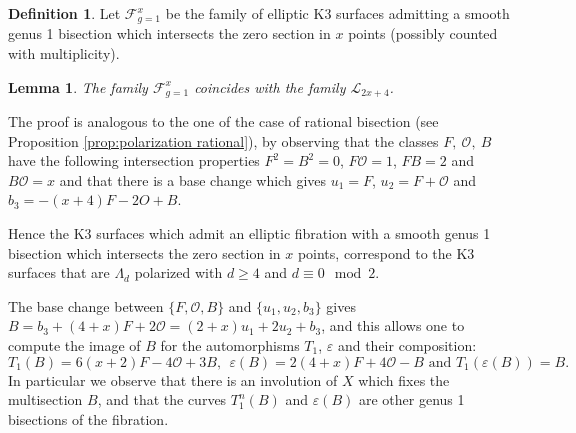 \documentclass{amsart}
\newtheorem{lemma}[theorem]{Lemma}
\theoremstyle{definition}
\newtheorem{definition}[theorem]{Definition}
\numberwithin{equation}{section}
\begin{document}
\begin{definition} Let $\mathcal{F}_{g=1}^x$ be the family of elliptic K3 surfaces admitting a smooth genus 1 bisection which intersects the zero section in $x$ points (possibly counted with multiplicity).\end{definition}
\begin{lemma}\label{lemma: family Fg1x} The family $\mathcal{F}^x_{g=1}$ coincides with the family $\mathcal{L}_{2x+4}$. 
\end{lemma}	
\proof The proof is analogous to the one of the case of rational bisection (see Proposition \ref{prop:polarization rational}), by observing that the classes $F,\ \mathcal{O},\ B$ have the following intersection properties $F^2=B^2=0$, $F\mathcal{O}=1$, $FB=2$ and $B\mathcal{O}=x$ and that there is a base change which gives $u_1=F$, $u_2=F+\mathcal{O}$ and $b_3=-(x+4)F-2O+B$.\endproof

Hence the K3 surfaces which admit an elliptic fibration with a smooth genus 1 bisection which intersects the zero section in $x$ points, correspond to the K3 surfaces that are $\Lambda_{d}$ polarized with $d\geq 4$ and $d\equiv 0\mod 2$. 


The base change between $\{F,\mathcal{O}, B\}$ and $\{u_1,u_2,b_3\}$ gives $B=b_3+(4+x)F+2\mathcal{O}=(2+x)u_1+2u_2+b_3$, and this allows one to compute the image of $B$ for the automorphisms $T_1$, $\varepsilon$ and their composition:
$$T_1(B)=6(x+2)F-4\mathcal{O}+3B,\ \ \varepsilon(B)=2(4+x)F+4\mathcal{O}-B \mbox{ and } T_1(\varepsilon(B))=B.$$ In particular we observe that there is an involution of $X$ which fixes the multisection $B$, and that the curves $T_1^n(B)$ and $\varepsilon(B)$ are other genus 1 bisections of the fibration.
\end{document}
